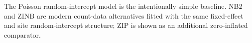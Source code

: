 \begin{table}[H]
\centering
\small
\caption{Salamanders model comparison and \texttt{DHARMa} diagnostics.}
\label{tab:empirical-salamanders-dharma-aic}
%
\par\vspace{0.5ex}\footnotesize{The Poisson random-intercept model is the intentionally simple baseline. NB2 and ZINB are modern count-data alternatives fitted with the same fixed-effect and site random-intercept structure; ZIP is shown as an additional zero-inflated comparator.}
\end{table}

